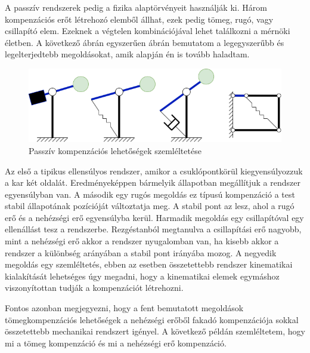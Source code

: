 A passzív rendszerek pedig a fizika alaptörvényeit használják ki. Három kompenzációs erőt létrehozó elemből állhat, ezek pedig tömeg, rugó, vagy csillapító elem. Ezeknek a végtelen kombinációjával lehet találkozni a mérnöki életben. A következő ábrán egyszerűen ábrán bemutatom a legegyszerűbb és legelterjedtebb megoldásokat, amik alapján én is tovább haladtam.

\begin{figure}[!ht]
\centering
\includegraphics[width=125mm, keepaspectratio]{figures/Diagrammok/Kompenzacios_lehetosegek_passziv}
\caption{Passzív kompenzációs lehetőségek szemléltetése}
\label{fig:Kompenzacios_lehetosegek_passziv}
\end{figure}

Az első a tipikus ellensúlyos rendszer, amikor a csuklópontkörül kiegyensúlyozzuk a kar két oldalát. Eredményeképpen bármelyik állapotban megállítjuk a rendszer egyensúlyban van. A második egy rugós megoldás ez típusú kompenzáció a test stabil állapotának pozícióját változtatja meg. A stabil pont az lesz, ahol a rugó erő és a nehézségi erő egyensúlyba kerül. Harmadik megoldás egy csillapítóval egy ellenállást tesz a rendszerbe. Rezgéstanból megtanulva a csillapítási erő nagyobb, mint a nehézségi erő akkor a rendszer nyugalomban van, ha kisebb akkor a rendszer a különbség arányában a stabil pont irányába mozog. A negyedik megoldás egy szemléltetés, ebben az esetben összetettebb rendszer kinematikai kialakítását lehetséges úgy megadni, hogy a kinematikai elemek egymáshoz viszonyítottan tudják a kompenzációt létrehozni.

Fontos azonban megjegyezni, hogy a fent bemutatott megoldások tömegkompenzációs lehetőségek a nehézségi erőből fakadó kompenzációja sokkal összetettebb mechanikai rendszert igényel. A következő példán szemléltetem, hogy mi a tömeg kompenzáció és mi a nehézségi erő kompenzáció.


